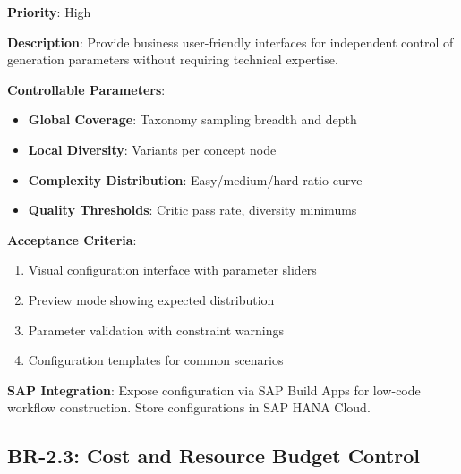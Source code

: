 \begin{tcolorbox}[colback=green!5,colframe=green!70,title=BR-2.2: Parameter Configuration Interface]
\textbf{Priority}: High

\textbf{Description}: Provide business user-friendly interfaces for independent
control of generation parameters without requiring technical expertise.

\textbf{Controllable Parameters}:
\begin{itemize}
  \item \textbf{Global Coverage}: Taxonomy sampling breadth and depth
  \item \textbf{Local Diversity}: Variants per concept node
  \item \textbf{Complexity Distribution}: Easy/medium/hard ratio curve
  \item \textbf{Quality Thresholds}: Critic pass rate, diversity minimums
\end{itemize}

\textbf{Acceptance Criteria}:
\begin{enumerate}
  \item Visual configuration interface with parameter sliders
  \item Preview mode showing expected distribution
  \item Parameter validation with constraint warnings
  \item Configuration templates for common scenarios
\end{enumerate}

\textbf{SAP Integration}: Expose configuration via SAP Build Apps for low-code
workflow construction. Store configurations in SAP HANA Cloud.
\end{tcolorbox}

\subsection{BR-2.3: Cost and Resource Budget Control}

